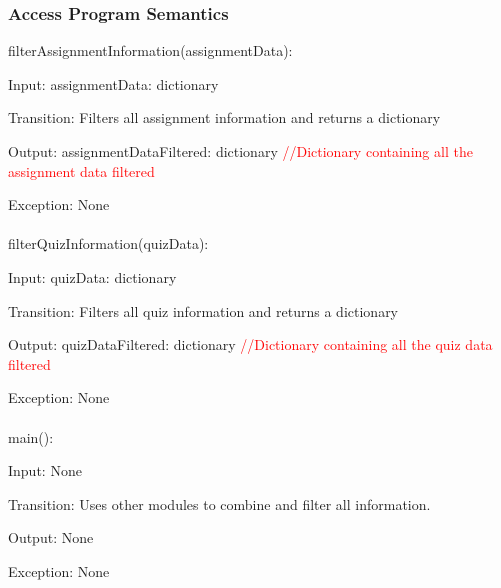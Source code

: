 \documentclass[12pt, titlepage]{article}
\begin{document}
\subsubsection{Access Program Semantics}
filterAssignmentInformation(assignmentData):
    
    Input: assignmentData: dictionary 
    
    Transition: Filters all assignment information and returns a dictionary
    
    Output: assignmentDataFiltered: dictionary \textcolor{red}{//Dictionary containing all the assignment data filtered}
    
    Exception: None
\\
\\
filterQuizInformation(quizData):

    Input: quizData: dictionary

    Transition: Filters all quiz information and returns a dictionary

    Output: quizDataFiltered: dictionary \textcolor{red}{//Dictionary containing all the quiz data filtered}

    Exception: None
\\
\\
main():

    Input: None

    Transition: Uses other modules to combine and filter all information.

    Output: None

    Exception: None
\\
\\
\end{document}
